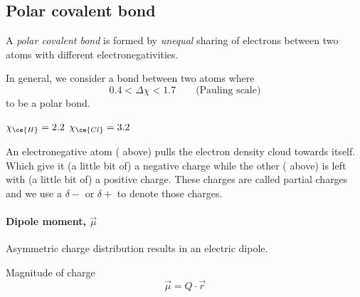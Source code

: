 \documentclass[../mit-general-chemistry.tex]{subfiles}
\begin{document}
\subsection{Polar covalent bond}

A {\em polar covalent bond} is formed by {\em unequal} sharing of
electrons between two atoms with different electronegativities.

In general, we consider a bond between two atoms where \[0.4 <
\Delta\chi < 1.7\qquad{\text{(Pauling scale)}}\] to be a polar bond.

\hspace*{\fill}
\hfill
$\chi_{\ce{H}} = 2.2$
\hfill
$\chi_{\ce{Cl}} = 3.2$
\hspace*{\fill}


An electronegative atom ( above) pulls the electron density
cloud towards itself. Which give it (a little bit of) a negative
charge while the other ( above) is left with (a little bit of) a
positive charge. These charges are called partial charges and we use a
$\delta -$ or $\delta +$ to denote those charges.

\begin{center}
\end{center}


\paragraph{Dipole moment, $\vec{\mu}$}

Asymmetric charge distribution results in an electric dipole.

\begin{center}
\end{center}

Magnitude of charge
\begin{equation*}
  \vec{\mu} = Q \cdot \vec{r}
\end{equation*}
\end{document}
